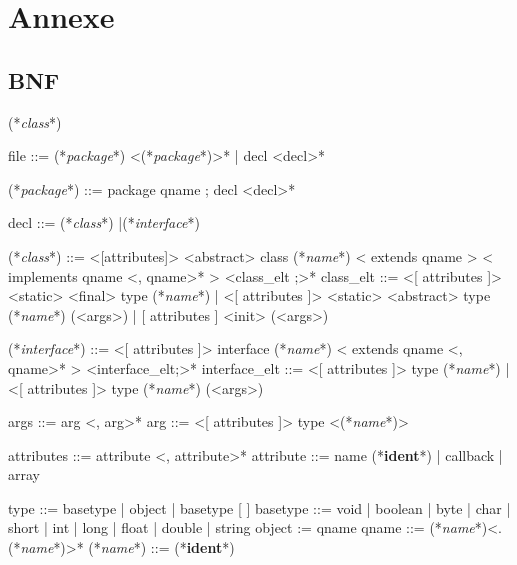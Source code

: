 \documentclass[a4paper, 11pt]{report}
\newcommand{\class}{\ttfamily\textit{class}}
\newcommand{\interface}{\ttfamily\textit{interface}}
\newcommand{\name}{\ttfamily\textit{name}}
\newcommand{\package}{\ttfamily\textit{package}}
\newcommand{\ident}{\footnotesize\textbf{ident}}
\begin{document}
\newpage
\section*{Annexe}


\subsection*{BNF}
\begin{idl}
(*\class*)

file ::= (*\package*) <(*\package*)>*
  	| decl <decl>*
 
(*\package*) ::= package qname ; decl <decl>*

decl ::= (*\class*)
  	|(*\interface*)
 
(*\class*) ::= <[attributes]> <abstract> class (*\name*)
  	  < extends qname >
  	  < implements qname <, qname>* >
  	  { <class_elt ;>* }
class_elt ::= <[ attributes ]> <static> <final> type (*\name*)
            | <[ attributes ]> <static> <abstract> type (*\name*) (<args>)
            | [ attributes ] <init> (<args>)
 
(*\interface*) ::= <[ attributes ]> interface (*\name*)
  	       < extends qname <, qname>* >
  	      { <interface_elt;>* }
interface_elt ::= 
     <[ attributes ]> type (*\name*)
   | <[ attributes ]> type (*\name*) (<args>)
 
args ::= arg <, arg>*
arg ::= <[ attributes ]> type <(*\name*)>
 
attributes ::= 	attribute <, attribute>*
attribute ::= name (*\ident*)
  	    | callback
  	    | array
 
type ::= basetype
       | object
       | basetype [ ]
basetype ::= void
           | boolean
           | byte
           | char
           | short
           | int
           | long
           | float
           | double
           | string
object := qname
qname ::= (*\name*)<.(*\name*)>*
(*\name*) ::= (*\ident*)
\end{idl}
\newpage
\end{document}

